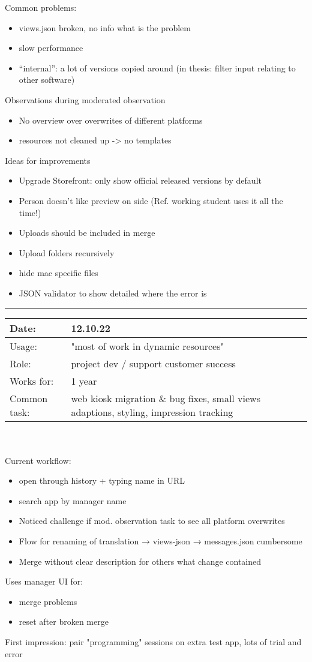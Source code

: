 Common problems:
\begin{itemize}[nosep]
  \item views.json broken, no info what is the problem
  \item slow performance
  \item “internal”: a lot of versions copied around (in thesis: filter input relating to other software)
\end{itemize}

Observations during moderated observation
\begin{itemize}[nosep]
  \item No overview over overwrites of different platforms
  \item resources not cleaned up -> no templates
\end{itemize}

Ideas for improvements
\begin{itemize}[nosep]
  \item Upgrade Storefront: only show official released versions by default
  \item Person doesn't like preview on side (Ref. working student uses it all the time!)
  \item Uploads should be included in merge
  \item Upload folders recursively
  \item hide mac specific files
  \item JSON validator to show detailed where the error is
\end{itemize}
\bigskip
\hrule

\begin{tabularx}{\linewidth}{lX}
  Date: & 12.10.22 \\
  \hline
  Usage: & "most of work in dynamic resources"\\
  \hline
  Role: & project dev / support customer success \\
  \hline
  Works for: & 1 year \\
  \hline
  Common task: &  web kiosk migration \& bug fixes, small views adaptions, styling, impression tracking
\end{tabularx}
\\\\
Current workflow:
\begin{itemize}[nosep]
  \item open through history + typing name in URL
  \item search app by manager name
  \item Noticed challenge if mod. observation task to see all platform overwrites
  \item Flow for renaming of translation → views-json → messages.json cumbersome
  \item Merge without clear description for others what change contained
\end{itemize}
Uses manager UI for:
\begin{itemize}[nosep]
  \item merge problems
  \item reset after broken merge
\end{itemize}
First impression: pair "programming" sessions on extra test app, lots of trial and error

